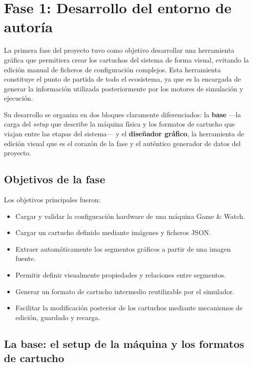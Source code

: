 \section{Fase 1: Desarrollo del entorno de autoría}
\label{sec:Fase1Resumen}

La primera fase del proyecto tuvo como objetivo desarrollar una
herramienta gráfica que permitiera crear los cartuchos del sistema de
forma visual, evitando la edición manual de ficheros de configuración
complejos. Esta herramienta constituye el punto de partida de todo el
ecosistema, ya que es la encargada de generar la información utilizada
posteriormente por los motores de simulación y ejecución.

Su desarrollo se organiza en dos bloques claramente diferenciados: la
\textbf{base} —la carga del \emph{setup} que describe la máquina física
y los formatos de cartucho que viajan entre las etapas del sistema— y
el \textbf{diseñador gráfico}, la herramienta de edición visual que es
el corazón de la fase y el auténtico generador de datos del proyecto.

\subsection{Objetivos de la fase}
\label{sec:F1Objetivos}

Los objetivos principales fueron:

\begin{itemize}
	\item Cargar y validar la configuración hardware de una máquina
	Game \& Watch.
	\item Cargar un cartucho definido mediante imágenes y ficheros JSON.
	\item Extraer automáticamente los segmentos gráficos a partir de una
	imagen fuente.
	\item Permitir definir visualmente propiedades y relaciones entre
	segmentos.
	\item Generar un formato de cartucho intermedio reutilizable por el
	simulador.
	\item Facilitar la modificación posterior de los cartuchos mediante
	mecanismos de edición, guardado y recarga.
\end{itemize}

\subsection{La base: el setup de la máquina y los formatos de cartucho}
\label{sec:F1Base}

